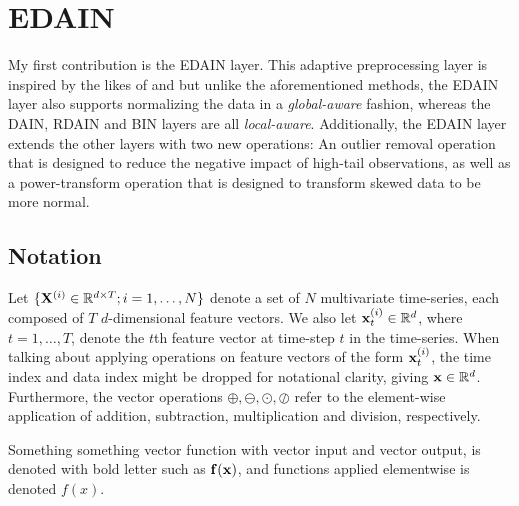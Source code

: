 \documentclass{statsmsc}
\begin{document}
\section{EDAIN}%
\label{sec:EDAIN-method}



My first contribution is the \ac{EDAIN} layer. This adaptive preprocessing layer is inspired
by the likes of \citep{dain}  and \citep{bin} but unlike the aforementioned methods, the
\ac{EDAIN} layer also supports normalizing the data in a \textit{global-aware} fashion, whereas
the \ac{DAIN}, \ac{RDAIN} and \ac{BIN} layers are all \textit{local-aware}.
Additionally, the \ac{EDAIN} layer extends the other layers with two new operations: An outlier
removal operation that is designed to reduce the negative impact of high-tail observations,
as well as a power-transform operation that is designed to transform skewed data to be more
normal.

\subsection{Notation}%
\label{sub:Notation}


Let $\{\mathbf{X}^{(i)} \in \mathbb{R}^{d \times T};i=1,\dots,N\}$ denote a set of $N$ multivariate time-series,
each composed of $T$ $d$-dimensional feature vectors. We also let $\mathbf{x}_t^{(i)}\in \mathbb{R}^d$,
where $t=1,\dots,T$, denote the $t$th feature vector at time-step $t$ in the time-series.
When talking about applying operations on feature vectors of the form $\mathbf{x}_t^{(i)}$, the time index and data index might
be dropped for notational clarity, giving $\mathbf{x} \in \mathbb{R}^d$. Furthermore, the vector operations
$\oplus, \ominus, \odot, \oslash$ refer to the element-wise
application of addition, subtraction, multiplication and division, respectively.

Something something vector function with vector input and vector output, is denoted with bold
letter such as $\mathbf{f}(\mathbf{x})$, and functions applied elementwise is denoted $f(x)$.
\end{document}
